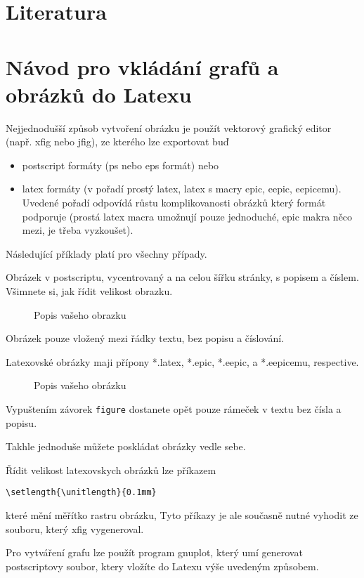 \section{Literatura}

\appendix

\section{Návod pro vkládání grafů a obrázků do Latexu}

Nejjednodušší způsob vytvoření obrázku je použít vektorový grafický
editor (např. xfig nebo jfig), ze kterého lze exportovat buď
\begin{itemize}
\item postscript formáty (ps nebo eps formát) nebo
\item latex formáty (v pořadí prostý latex, latex s macry epic, eepic, eepicemu). Uvedené pořadí odpovídá růstu
komplikovanosti obrázků který formát podporuje (prostá latex macra
umožnují pouze jednoduché, epic makra něco mezi, je třeba
vyzkoušet).

\end{itemize}
Následující příklady platí pro všechny případy.

Obrázek v postscriptu, vycentrovaný a na celou šířku stránky, s
popisem a číslem. Všimnete si, jak řídit velikost obrazku.
\begin{figure}[ht]
\epsfysize=3cm \centerline{} \caption{Popis
vašeho obrazku} \label{labelvasehoobrazku}
\end{figure}

Obrázek pouze vložený mezi řádky textu, bez popisu a číslování.\\
\epsfxsize=1cm
\rule{0pt}{0pt}\hfill{}\hfill\rule{0pt}{0pt}

Latexovské obrázky maji přípony *.latex, *.epic, *.eepic, a
*.eepicemu, respective.
\begin{figure}[ht]
\begin{center}

\end{center}
\caption{Popis vašeho obrázku} \label{l1}
\end{figure}
Vypuštením závorek {\tt figure} dostanete opět pouze rámeček v textu
bez čísla a popisu.

Takhle jednoduše můžete poskládat obrázky vedle sebe.
\begin{center}
\setlength{\unitlength}{0.1mm}
\hglue 5mm
\setlength{\unitlength}{0.15mm}
\hglue 5mm
\setlength{\unitlength}{0.2mm}
\end{center}
Řídit velikost latexovskych obrázků lze příkazem
\begin{verbatim}
\setlength{\unitlength}{0.1mm}
\end{verbatim}
které mění měřítko rastru obrázku, Tyto příkazy je ale současně
nutné vyhodit ze souboru, který xfig vygeneroval.

Pro vytváření grafu lze použít program gnuplot, který umí generovat
postscriptovy soubor, ktery vložíte do Latexu výše uvedeným
způsobem.